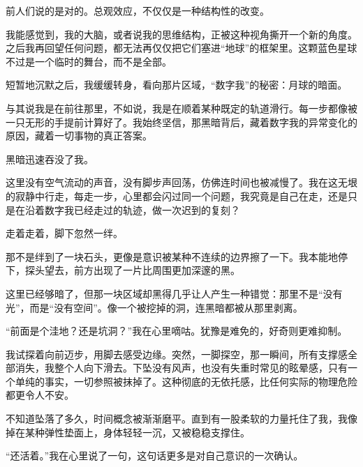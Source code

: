 前人们说的是对的。总观效应，不仅仅是一种结构性的改变。

我能感觉到，我的大脑，或者说我的思维结构，正被这种视角撕开一个新的角度。之后我再回望任何问题，都无法再仅仅把它们塞进“地球”的框架里。这颗蓝色星球不过是一个临时的舞台，而不是全部。

短暂地沉默之后，我缓缓转身，看向那片区域，“数字我”的秘密：月球的暗面。

与其说我是在前往那里，不如说，我是在顺着某种既定的轨道滑行。每一步都像被一只无形的手提前计算好了。我始终坚信，那黑暗背后，藏着数字我的异常变化的原因，藏着一切事物的真正答案。

黑暗迅速吞没了我。

这里没有空气流动的声音，没有脚步声回荡，仿佛连时间也被减慢了。我在这无垠的寂静中行走，每走一步，心里都会闪过同一个问题，我究竟是自己在走，还是只是在沿着数字我已经走过的轨迹，做一次迟到的复刻？

走着走着，脚下忽然一绊。

那不是绊到了一块石头，更像是意识被某种不连续的边界擦了一下。我本能地停下，探头望去，前方出现了一片比周围更加深邃的黑。

这里已经够暗了，但那一块区域却黑得几乎让人产生一种错觉：那里不是“没有光”，而是“没有空间”。像一个被挖掉的洞，连黑暗都被从那里剥离。

“前面是个洼地？还是坑洞？”我在心里嘀咕。犹豫是难免的，好奇则更难抑制。

我试探着向前迈步，用脚去感受边缘。突然，一脚探空，那一瞬间，所有支撑感全部消失，我整个人向下滑去。下坠没有风声，也没有失重时常见的眩晕感，只有一个单纯的事实，一切参照被抹掉了。这种彻底的无依托感，比任何实际的物理危险都更令人不安。

不知道坠落了多久，时间概念被渐渐磨平。直到有一股柔软的力量托住了我，我像掉在某种弹性垫面上，身体轻轻一沉，又被稳稳支撑住。

“还活着。”我在心里说了一句，这句话更多是对自己意识的一次确认。
